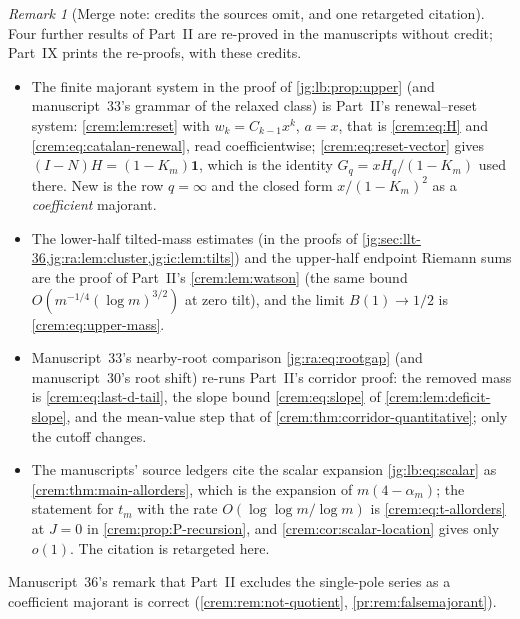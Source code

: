 \documentclass[11pt,a4paper]{article}
\theoremstyle{definition}\newaliascnt{definition}{theorem}
\theoremstyle{remark}\newaliascnt{remark}{theorem}
\newtheorem{remark}[remark]{Remark}
\newcommand{\one}{\mathbf 1}
\begin{document}
\begin{remark}[Merge note: credits the sources omit, and one retargeted citation]
\label{jg:rem:credits}
Four further results of Part~II are re-proved in the manuscripts without
credit; Part~IX prints the re-proofs, with these credits.
\begin{itemize}
\item The finite majorant system in the proof of \cref{jg:lb:prop:upper} (and
 manuscript~33's grammar of the relaxed class) is Part~II's renewal--reset
 system: \cref{crem:lem:reset} with $w_k=C_{k-1}x^k$, $a=x$, that is
 \eqref{crem:eq:H} and \eqref{crem:eq:catalan-renewal}, read coefficientwise;
 \eqref{crem:eq:reset-vector} gives $(I-N)H=(1-K_m)\one$, which is the
 identity $G_q=xH_q/(1-K_m)$ used there. New is the row $q=\infty$ and the
 closed form $x/(1-K_m)^2$ as a \emph{coefficient} majorant.
\item The lower-half tilted-mass estimates (in the proofs of
 \cref{jg:sec:llt-36,jg:ra:lem:cluster,jg:ic:lem:tilts}) and the upper-half
 endpoint Riemann sums are the proof of Part~II's \cref{crem:lem:watson} (the
 same bound $O(m^{-1/4}(\log m)^{3/2})$ at zero tilt), and the limit
 $B(1)\to1/2$ is \eqref{crem:eq:upper-mass}.
\item Manuscript~33's nearby-root comparison \eqref{jg:ra:eq:rootgap} (and
 manuscript~30's root shift) re-runs Part~II's corridor proof:
 the removed mass is \eqref{crem:eq:last-d-tail}, the slope bound
 \eqref{crem:eq:slope} of \cref{crem:lem:deficit-slope}, and the mean-value
 step that of \cref{crem:thm:corridor-quantitative}; only the cutoff changes.
\item The manuscripts' source ledgers cite the scalar expansion
 \eqref{jg:lb:eq:scalar} as \cref{crem:thm:main-allorders}, which is the
 expansion of $m(4-\alpha_m)$; the statement for $t_m$ with the rate
 $O(\log\log m/\log m)$ is \eqref{crem:eq:t-allorders} at $J=0$ in
 \cref{crem:prop:P-recursion}, and \cref{crem:cor:scalar-location} gives
 only $o(1)$. The citation is retargeted here.
\end{itemize}
Manuscript~36's remark that Part~II excludes the single-pole series as a
coefficient majorant is correct (\cref{crem:rem:not-quotient},
\cref{pr:rem:falsemajorant}).
\end{remark}
\end{document}
